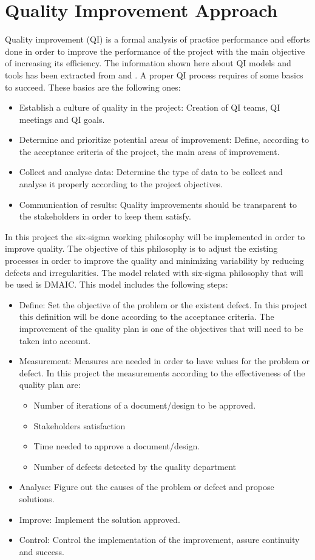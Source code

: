\section{Quality Improvement Approach}
Quality improvement (QI) is a formal analysis of practice performance and efforts done in order to improve the performance of the project with the main objective of increasing its efficiency. The information shown here about QI models and tools has been extracted from \cite{aafp} and \cite{leansolutions}. A proper QI process requires of some basics to succeed. These basics are the following ones:
\begin{itemize}
\item Establish a culture of quality in the project: Creation of QI teams, QI meetings and QI goals.
\item Determine and prioritize potential areas of improvement: Define, according to the acceptance criteria of the project, the main areas of improvement.
\item Collect and analyse data: Determine the type of data to be collect and analyse it properly according to the project objectives.
\item Communication of results: Quality improvements should be transparent to the stakeholders in order to keep them satisfy. 
\end{itemize}
In this project the six-sigma working philosophy will be implemented in order to improve quality. The objective of this philosophy is to adjust the existing processes in order to improve the quality and minimizing variability by reducing defects and irregularities. The model related with six-sigma philosophy that will be used is DMAIC. This model includes the following steps:
\begin{itemize}
\item Define: Set the objective of the problem or the existent defect. In this project this definition will be done according to the acceptance criteria. The improvement of the quality plan is one of the objectives that will need to be taken into account.
\item Measurement: Measures are needed in order to have values for the problem or defect. In this project the measurements according to the effectiveness of the quality plan are:
\begin{itemize}
\item Number of iterations of a document/design to be approved.
\item Stakeholders satisfaction
\item Time needed to approve a document/design.
\item Number of defects detected by the quality department
\end{itemize}
\item Analyse: Figure out the causes of the problem or defect and propose solutions.
\item Improve: Implement the solution approved.
\item Control: Control the implementation of the improvement, assure continuity and success.
\end{itemize}